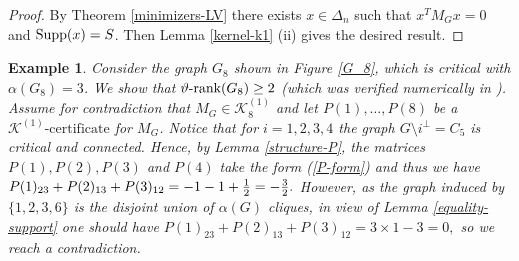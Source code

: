 \documentclass[11pt]{article}
\newcommand{\ignore}[1]{}
\newtheorem{example}[theorem]{Example}
\newcommand{\konec}{\MK^{(1)}\text{-certificate}}
\numberwithin{equation}{section}
\newcommand{\supp}{\text{\rm Supp}}
\newcommand{\MK}{{\mathcal K}}
\newcommand{\rrank}{\vartheta\text{\rm -rank}}
\begin{document}
	\begin{proof}
	By Theorem \ref{minimizers-LV} there exists $x\in \Delta_n$ such that $x^TM_Gx=0$ and $\supp(x)=S$. Then Lemma \ref{kernel-k1} (ii) gives  the desired result.
	\end{proof}


\begin{example}
Consider the graph $G_8$ shown in Figure \ref{G_8}, which is critical with $\alpha(G_8)=3$.
We show that $\rrank(G_8)\geq 2$ (which was verified numerically in \cite{PVZ2007}).  Assume for contradiction  that $M_G\in \MK_8^{(1)}$ and let $P(1), \dots, P(8)$ be a $\konec$ for $M_G$. Notice that for $i=1,2,3,4$ the graph $G\setminus i^\perp =C_5$ is critical and connected. Hence, by Lemma \ref{structure-P}, the matrices $P(1), P(2), P(3)$ and $P(4)$ take the form (\ref{P-form}) and thus we have 
$P(1)_{23} + P(2)_{13} + P(3)_{12}=-1-1+{1\over 2}=-\frac{3}{2}.$
However, as the graph induced by $\{1,2,3, 6\}$ is the disjoint union of $\alpha(G)$ cliques, in view of Lemma \ref{equality-support} one should have 
$P(1)_{23} + P(2)_{13} + P(3)_{12}=3 \times 1-3=0,$
so we reach a contradiction.
\ignore{
\begin{figure}[H]
\begin{minipage}{0.5\linewidth}
\begin{center}
\definecolor{xdxdff}{rgb}{0,0,0}
\definecolor{ududff}{rgb}{0,0,0}
\begin{tikzpicture}[line cap=round,line join=round,>=triangle 45,x=0.5cm,y=0.5cm]
\clip(-11.74,0.89) rectangle (-2,7.79);
\draw [line width=1pt] (-10.44,5.45)-- (-10.42,3.25);
\draw [line width=1pt] (-10.42,3.25)-- (-5.98,3.19);
\draw [line width=1pt] (-5.98,3.19)-- (-5.98,5.43);
\draw [line width=1pt] (-10.44,5.45)-- (-5.98,5.43);
\draw [line width=1pt] (-8.780123064548562,5.442556605670621)-- (-7.719952528756618,3.2135128720102246);
\draw [line width=1pt] (-8.900277524192076,3.2294632097863794)-- (-7.640056304041826,5.437444198672833);
\begin{scriptsize}
\draw [fill=ududff] (-10.44,5.45) circle (2.5pt);
\draw[color=ududff] (-10.28,5.88) node {$1$};
\draw [fill=ududff] (-10.42,3.25) circle (2.5pt);
\draw[color=ududff] (-10.5,2.72) node {$2$};
\draw [fill=ududff] (-5.98,3.19) circle (2.5pt);
\draw[color=ududff] (-6.02,2.72) node {$3$};
\draw [fill=ududff] (-5.98,5.43) circle (2.5pt);
\draw[color=ududff] (-5.82,5.86) node {$4$};
\draw [fill=xdxdff] (-8.780123064548562,5.442556605670621) circle (2.5pt);
\draw[color=xdxdff] (-8.8,5.92) node {$5$};

\end{scriptsize}
\end{tikzpicture}
\end{center}
\end{minipage}
\end{figure}}
\end{example}
\end{document}
